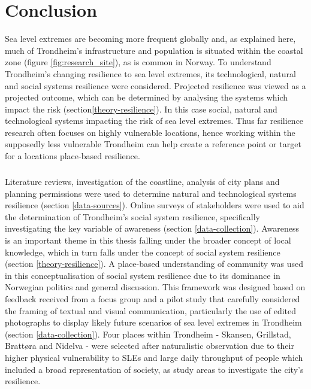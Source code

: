 


\chapter{Conclusion}

Sea level extremes are becoming more frequent globally and, as explained here, much of Trondheim's infrastructure and population is situated within the coastal zone (figure \ref{fig:research_site}), as is common in Norway. To understand Trondheim's changing resilience to sea level extremes, its technological, natural and social systems resilience were considered.  Projected resilience was viewed as a projected outcome, which can be determined by analysing the systems which impact the risk (section\ref{theory-resilience}). In this case social, natural and technological systems impacting the risk of sea level extremes. Thus far resilience research often focuses on highly vulnerable locations, hence working within the supposedly less vulnerable Trondheim can help create a reference point or target for a locations place-based resilience.
\paragraph{}

Literature reviews, investigation of the coastline, analysis of city plans and planning permissions were used to determine natural and technological systems resilience (section \ref{data-sources}). Online surveys of stakeholders were used to aid the determination of Trondheim's social system resilience, specifically investigating the key variable of awareness (section \ref{data-collection}). Awareness is an important theme in this thesis falling under the broader concept of local knowledge, which in turn falls under the concept of social system resilience (section \ref{theory-resilience}). A place-based understanding of community was used in this conceptualisation of social system resilience due to its dominance in Norwegian politics and general discussion. This framework was designed based on feedback received from a focus group and a pilot study that carefully considered the framing of textual and visual communication, particularly the use of edited photographs to display likely future scenarios of sea level extremes in Trondheim (section \ref{data-collection}). Four places within Trondheim - Skansen, Grillstad, Brattøra and Nidelva - were selected after naturalistic observation due to their higher physical vulnerability to SLEs and large daily throughput of people which included a broad representation of society, as study areas to investigate the city's resilience.


